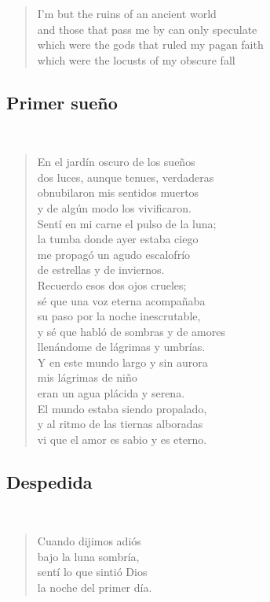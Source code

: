 \documentclass[a4paper, 12pt]{article}
\begin{document}
\begin{verse}
I'm but the ruins of an ancient world\\
and those that pass me by can only speculate\\
which were the gods that ruled my pagan faith\\
which were the locusts of my obscure fall\\
\end{verse}

\pagebreak 
\subsection{Primer sueño}
~ 

\begin{verse}
En el jardín oscuro de los sueños\\
dos luces, aunque tenues, verdaderas\\
obnubilaron mis sentidos muertos\\
y de algún modo los vivificaron.\\
Sentí en mi carne el pulso de la luna;\\
la tumba donde ayer estaba ciego\\
me propagó un agudo escalofrío\\
de estrellas y de inviernos.\\
Recuerdo esos dos ojos crueles;\\
sé que una voz eterna acompañaba\\
su paso por la noche inescrutable,\\
y sé que habló de sombras y de amores\\
llenándome de lágrimas y umbrías.\\
Y en este mundo largo y sin aurora\\
mis lágrimas de niño\\
eran un agua plácida y serena.\\
El mundo estaba siendo propalado,\\
y al ritmo de las tiernas alboradas\\
vi que el amor es sabio y es eterno.\\
\end{verse}

\pagebreak

\subsection{Despedida}
~ 

\begin{verse}
    
Cuando dijimos adiós\\
bajo la luna sombría,\\
sentí lo que sintió Dios\\
la noche del primer día.\\
\end{verse}
\end{document}
